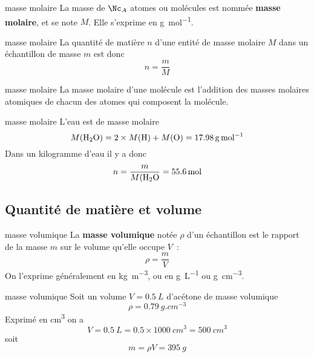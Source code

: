 \documentclass[../main/main.tex]{subfiles}
\begin{document}
\begin{tcbraster}[raster columns=2, raster equal height=rows]
    \begin{defi}[label=massemol]{masse molaire}
        La masse de $\Nc_A$ atomes ou molécules est nommée \textbf{masse
        molaire}, et se note $M$.
        Elle s'exprime en \si{g.mol^{-1}}.
    \end{defi}
    \begin{impl}[label=imple:massemol]{masse molaire}
        La quantité de matière $n$ d'une entité de masse molaire $M$ dans un
        échantillon de masse $m$ est donc
        \[ n = \frac{m}{M}\]
    \end{impl}
    \begin{prop}[label=prop:massemol]{masse molaire}
        La masse molaire d'une molécule est l'addition des masses molaires
        atomiques de chacun des atomes qui composent la molécule.
    \end{prop}
    \begin{exem}[label=exem:massemol]{masse molaire}
        L'eau est de masse molaire
        \[M({\rm H}_2{\rm O}) = 2\times M({\rm H}) + M({\rm O}) =
        \SI{17.98}{g.mol^{-1}}\]
        Dans un kilogramme d'eau il y a donc
        \[n = \frac{m}{M({\rm H}_2{\rm O}} = \SI{55.6}{mol}\]
    \end{exem}
\end{tcbraster}

\subsection{Quantité de matière et volume}
\begin{tcbraster}[raster columns=2, raster equal height=rows]
    \begin{defi}[label=defi:massevol]{masse volumique}
        La \textbf{masse volumique} notée $\rho$ d'un échantillon est le rapport
        de la masse $m$ sur le volume qu'elle occupe $V$~:
        \[ \rho = \frac{m}{V}\]
        On l'exprime généralement en \si{kg.m^{-3}}, ou en \si{g.L^{-1}} ou
        \si{g.cm^{-3}}.
    \end{defi}
    \begin{exem}[label=exem:massvol]{masse volumique}
        Soit un volume $V = \SI{0.5}{L}$ d'acétone de masse volumique
        \[\rho = \SI{0.79}{g.cm^{-3}}\]
        Exprimé en \si{cm^3} on a
        \[V = \SI{0.5}{L} = \num{0.5}\times \SI{1000}{cm^3} = \SI{500}{cm^3}\]
        soit
        \[\boxed{m = \rho V = \SI{395}{g}}\]
    \end{exem}
\end{tcbraster}
\end{document}
